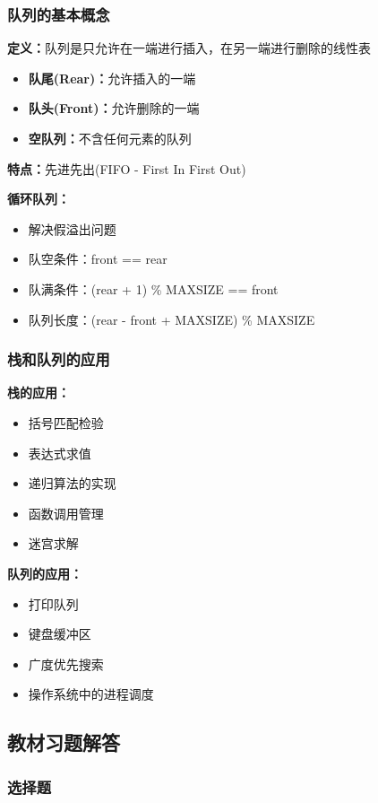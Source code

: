 \documentclass[12pt,a4paper]{amsart}
\begin{document}
\subsubsection{队列的基本概念}
\textbf{定义：}队列是只允许在一端进行插入，在另一端进行删除的线性表
\begin{itemize}
\item \textbf{队尾(Rear)：}允许插入的一端
\item \textbf{队头(Front)：}允许删除的一端
\item \textbf{空队列：}不含任何元素的队列
\end{itemize}

\textbf{特点：}先进先出(FIFO - First In First Out)

\textbf{循环队列：}
\begin{itemize}
\item 解决假溢出问题
\item 队空条件：front == rear
\item 队满条件：(rear + 1) \% MAXSIZE == front
\item 队列长度：(rear - front + MAXSIZE) \% MAXSIZE
\end{itemize}

\subsubsection{栈和队列的应用}

\textbf{栈的应用：}
\begin{itemize}
\item 括号匹配检验
\item 表达式求值
\item 递归算法的实现
\item 函数调用管理
\item 迷宫求解
\end{itemize}

\textbf{队列的应用：}
\begin{itemize}
\item 打印队列
\item 键盘缓冲区
\item 广度优先搜索
\item 操作系统中的进程调度
\end{itemize}

\subsection{教材习题解答}

\subsubsection{选择题}
\end{document}
